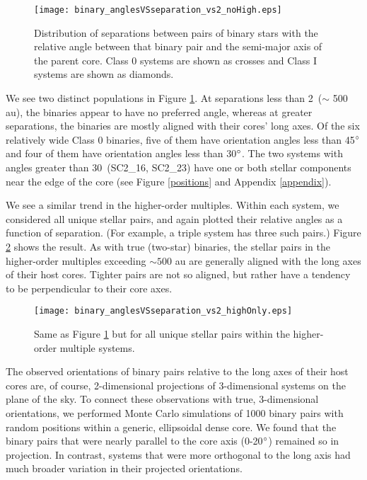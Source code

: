 \documentclass[usenatbib,a4paper]{mnras}
\begin{document}
\begin{figure}
\texttt{[image: binary\_anglesVSseparation\_vs2\_noHigh.eps]}
\caption{Distribution of separations between pairs of binary stars with the relative angle between that binary pair and the semi-major axis of the parent core.  Class 0 systems are shown as crosses and Class I systems are shown as diamonds.  \label{angleVSsep}}
\end{figure}

We see two distinct populations in Figure \ref{angleVSsep}.  At separations less than 2\arcsec\ ($\sim$ 500 au), the binaries appear to have no preferred angle, whereas at greater separations, the binaries are mostly aligned with their cores' long axes.    Of the six relatively wide Class 0 binaries, five of them have orientation angles less than 45$\degree$ and four of them have orientation angles less than 30$\degree$.  The two systems with angles greater than $30$\degree\ (SC2\_16, SC2\_23) have one or both stellar components near the edge of the core (see Figure \ref{positions} and Appendix \ref{appendix}).

We see a similar trend in the higher-order multiples.  Within each system, we considered all unique stellar pairs, and again plotted their relative angles as a function of separation.  (For example, a triple system has three such pairs.)  Figure \ref{angleVSsepHigh} shows the result.  As with true (two-star) binaries, the stellar pairs in the higher-order multiples exceeding $\sim 500$ au are generally aligned with the long axes of their host cores.  Tighter pairs are not so aligned, but rather have a tendency to be perpendicular to their core axes.    

\begin{figure}
\texttt{[image: binary\_anglesVSseparation\_vs2\_highOnly.eps]}
\caption{Same as Figure \ref{angleVSsep} but for all unique stellar pairs within the higher-order multiple systems. \label{angleVSsepHigh}}
\end{figure}

The observed orientations of binary pairs relative to the long axes of their host cores are, of course, 2-dimensional projections of 3-dimensional systems on the plane of the sky. To connect these observations with true, 3-dimensional orientations, we performed Monte Carlo simulations of 1000 binary pairs with random positions within a generic, ellipsoidal dense core. We found that the binary pairs that were nearly parallel to the core axis (0-20$\degree$) remained so in projection.   In contrast, systems that were more orthogonal to the long axis had much broader variation in their projected orientations.
\end{document}
